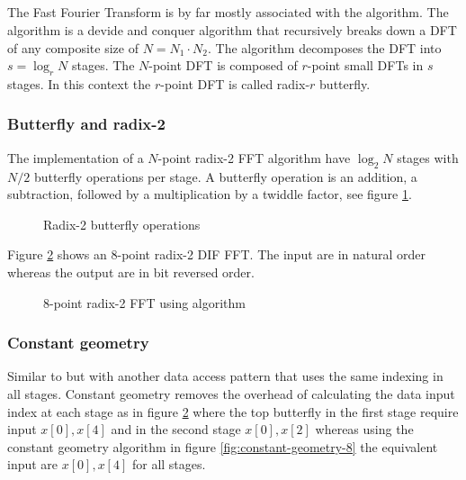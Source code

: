 \subsection{\CTALG}

The Fast Fourier Transform is by far mostly associated with the {\CTALG} algorithm\cite{cooley1965algorithm}. The {\CTALG} algorithm is a devide and conquer algorithm that recursively breaks down a \gls{DFT} of any composite size of $N = N_1{\cdot}N_2$. The algorithm decomposes the \gls{DFT} into $s = \log_r{N}$ stages. The $N$-point \gls{DFT} is composed of $r$-point small \gls{DFT}s in $s$ stages. In this context the $r$-point \gls{DFT} is called radix-$r$ butterfly.

\subsubsection{Butterfly and radix-2}

The implementation of a $N$-point radix-2 \gls{FFT} algorithm have $\log_2{N}$ stages with $N/2$ butterfly operations per stage. A butterfly operation is an addition, a subtraction, followed by a multiplication by a twiddle factor, see figure \ref{fig:butterfly}.

\begin{figure}
	\centering
	
	\caption{Radix-2 butterfly operations}
	\label{fig:butterfly}
\end{figure}

Figure \ref{fig:cooley-tukey-8} shows an 8-point radix-2 \gls{DIF} \gls{FFT}. The input are in natural order whereas the output are in bit reversed order.

\begin{figure}
	\centering
	
	\caption{8-point radix-2 \gls{FFT} using {\CTALG} algorithm}
	\label{fig:cooley-tukey-8}
\end{figure}

\subsubsection{Constant geometry}

Similar to {\CTALG} but with another data access pattern that uses the same indexing in all stages. Constant geometry removes the overhead of calculating the data input index at each stage as in figure \ref{fig:cooley-tukey-8} where the top butterfly in the first stage require input $x[0], x[4]$ and in the second stage $x[0], x[2]$ whereas using the constant geometry algorithm in figure \ref{fig:constant-geometry-8} the equivalent input are $x[0], x[4]$ for all stages.

